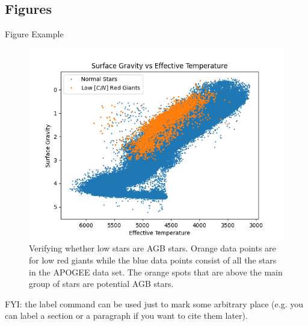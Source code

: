 \subsection{Figures}

\begin{frame}{Figure Example}

\begin{figure}
    \centering
    \includegraphics[width=\columnwidth/3]{Figures/AGBProof.png}
    \caption{Verifying whether low \CN stars are AGB stars. Orange data points are for low \CN red giants while the blue data points consist of all the stars in the APOGEE data set. The orange spots that are above the main group of stars are potential AGB stars.}
    \label{fig:AGB_PROOF}
\end{figure}

FYI: the label command can be used just to mark some arbitrary place (e.g. you can label a section or a paragraph if you want to cite them later).
\end{frame}

